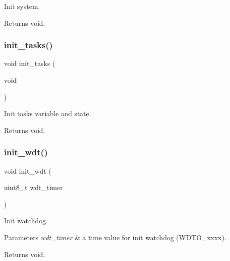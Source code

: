 Init system. 

\begin{DoxyReturn}{Returns}
void. 
\end{DoxyReturn}
\mbox{\label{i2c-rain_8ino_ab4bf0a3d77da083f131d3fa35a37d2b1}} 
\subsubsection{\texorpdfstring{init\+\_\+tasks()}{init\_tasks()}}
{\footnotesize\ttfamily void init\+\_\+tasks (\begin{DoxyParamCaption}\item[{void}]{ }\end{DoxyParamCaption})}



Init tasks variable and state. 

\begin{DoxyReturn}{Returns}
void. 
\end{DoxyReturn}
\mbox{\label{i2c-rain_8ino_a980e73df66b14b1190bc25da430a4f12}} 
\subsubsection{\texorpdfstring{init\+\_\+wdt()}{init\_wdt()}}
{\footnotesize\ttfamily void init\+\_\+wdt (\begin{DoxyParamCaption}\item[{uint8\+\_\+t}]{wdt\+\_\+timer }\end{DoxyParamCaption})}



Init watchdog. 


\begin{DoxyParams}{Parameters}
{\em wdt\+\_\+timer} & a time value for init watchdog (W\+D\+T\+O\+\_\+xxxx). \\
\hline
\end{DoxyParams}
\begin{DoxyReturn}{Returns}
void. 
\end{DoxyReturn}
\mbox{\label{i2c-rain_8ino_a2441543100bf8421f56edd622a2c1d9a}} 
